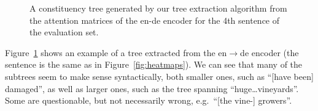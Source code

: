 \documentclass[11pt,a4paper]{article}
\newcommand\eg{e.g.\ }
\newcommand\ie{i.e.\ }
\begin{document}



\begin{figure}[t]
\caption{A constituency tree generated by our tree extraction algorithm from the attention matrices of the en-de encoder for the 4th sentence of the evaluation set.
}
\label{fig:tree}
\end{figure}


Figure~\ref{fig:tree} shows an example of a tree extracted from the en$\rightarrow$de encoder (the sentence is the same as in Figure~\ref{fig:heatmaps}).
We can see that many of the subtrees seem to make sense syntactically, both smaller ones, such as ``[have been] damaged'',
as well as larger ones, such as the tree spanning ``huge\ldots vineyards''.
Some are questionable, but not necessarily wrong, \eg ``[the vine-] growers''.
\end{document}
